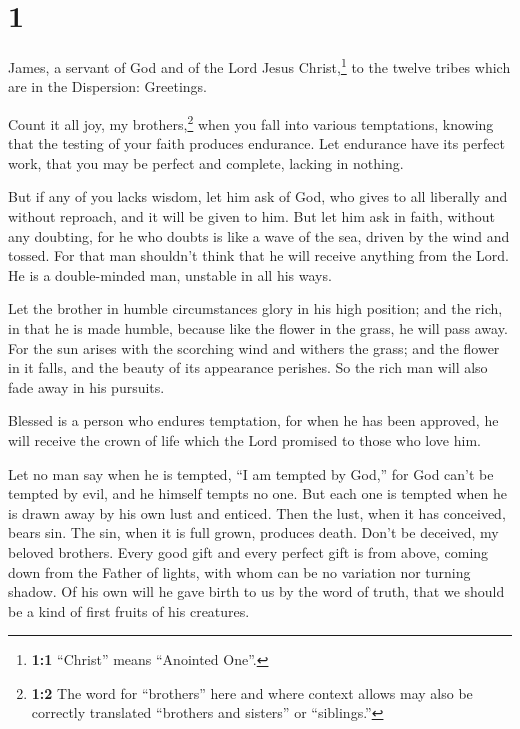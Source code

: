 \hypertarget{section}{%
\section{1}\label{section}}

 James, a servant of God and of the Lord Jesus
Christ,\footnote{\textbf{1:1} ``Christ'' means ``Anointed One''.} to the
twelve tribes which are in the Dispersion: Greetings.

 Count it all joy, my brothers,\footnote{\textbf{1:2} The
  word for ``brothers'' here and where context allows may also be
  correctly translated ``brothers and sisters'' or ``siblings.''} when
you fall into various temptations,  knowing that the
testing of your faith produces endurance.  Let endurance
have its perfect work, that you may be perfect and complete, lacking in
nothing.

 But if any of you lacks wisdom, let him ask of God, who
gives to all liberally and without reproach, and it will be given to
him.  But let him ask in faith, without any doubting, for
he who doubts is like a wave of the sea, driven by the wind and tossed.
 For that man shouldn't think that he will receive
anything from the Lord.  He is a double-minded man,
unstable in all his ways.

 Let the brother in humble circumstances glory in his high
position;  and the rich, in that he is made humble,
because like the flower in the grass, he will pass away. 
For the sun arises with the scorching wind and withers the grass; and
the flower in it falls, and the beauty of its appearance perishes. So
the rich man will also fade away in his pursuits.

 Blessed is a person who endures temptation, for when he
has been approved, he will receive the crown of life which the Lord
promised to those who love him.

 Let no man say when he is tempted, ``I am tempted by
God,'' for God can't be tempted by evil, and he himself tempts no one.
 But each one is tempted when he is drawn away by his own
lust and enticed.  Then the lust, when it has conceived,
bears sin. The sin, when it is full grown, produces death.
 Don't be deceived, my beloved brothers. 
Every good gift and every perfect gift is from above, coming down from
the Father of lights, with whom can be no variation nor turning shadow.
 Of his own will he gave birth to us by the word of
truth, that we should be a kind of first fruits of his creatures.

